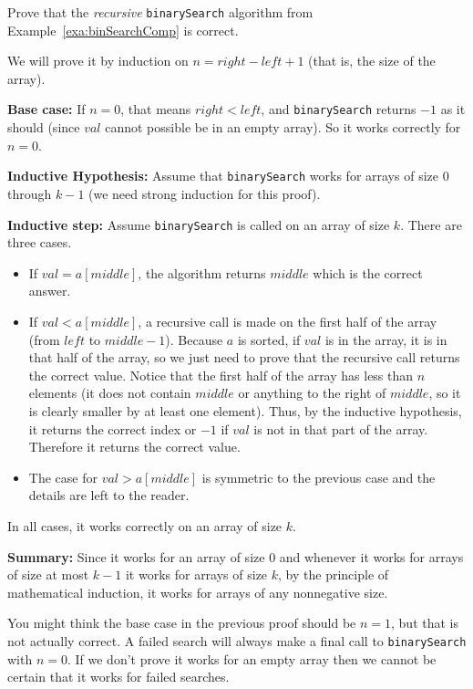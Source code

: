 \begin{exa}
Prove that the {\em recursive} \verb+binarySearch+ algorithm from
Example~\ref{exa:binSearchComp} is correct.
\begin{pf}
We will prove it by induction on $n=right-left+1$ (that is, the size of the array).

\noindent
{\bf Base case:}
If $n=0$, that means $right<left$, and \verb+binarySearch+ returns $-1$ as it should (since $val$ cannot possible be in an empty array).  
So it works
correctly for $n=0$.

\noindent
{\bf Inductive Hypothesis:}
Assume that \verb+binarySearch+ works for arrays of size $0$ through $k-1$ (we need strong induction for this proof).

\noindent
{\bf Inductive step:}
Assume \verb+binarySearch+ is called on an array of size $k$.  There are three cases.
\begin{itemize}
\item
If $val=a[middle]$, the algorithm returns $middle$ which is the correct answer.
\item
If $val<a[middle]$, a recursive call is made on the first half of the array (from $left$ to $middle-1$).  
Because $a$ is sorted, if $val$ is in the array, it is in that half of the array, so we just need to prove that the
recursive call returns the correct value.
Notice that the first half of the array has less than $n$ elements (it does not contain $middle$ or anything to the right of $middle$, so
it is clearly smaller by at least one element).
Thus, by the inductive hypothesis, it returns the correct index or $-1$ if $val$ is not in that part of the array.  
Therefore it returns the correct value.
\item
The case for $val>a[middle]$ is symmetric to the previous case and the details are left to the reader.
\end{itemize}
In all cases, it works correctly on an array of size $k$.

\noindent
{\bf Summary:}
Since it works for an array of size $0$ and whenever it works for arrays of size at most $k-1$ it works for arrays of size $k$,
by the principle of mathematical induction, it works for arrays of any nonnegative size.
\end{pf}
\end{exa}

\begin{rem}
You might think the base case in the previous proof should be $n=1$, but that is not actually correct. A failed search will always
make a final call to \verb+binarySearch+ with $n=0$.  If we don't prove it works for an empty array then we cannot
be certain that it works for failed searches.
\end{rem}

